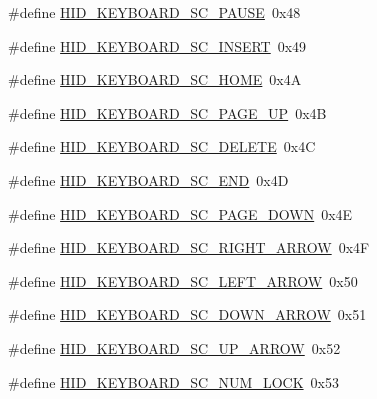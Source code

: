 \begin{DoxyCompactItemize}
\item 
\#define \hyperlink{group__Group__USBClassHIDCommon_gad817755f4cf1b28a8c1b7573e889bf60}{H\+I\+D\+\_\+\+K\+E\+Y\+B\+O\+A\+R\+D\+\_\+\+S\+C\+\_\+\+P\+A\+U\+SE}~0x48
\item 
\#define \hyperlink{group__Group__USBClassHIDCommon_gaf4e77aed5bf87814998181cf5f490067}{H\+I\+D\+\_\+\+K\+E\+Y\+B\+O\+A\+R\+D\+\_\+\+S\+C\+\_\+\+I\+N\+S\+E\+RT}~0x49
\item 
\#define \hyperlink{group__Group__USBClassHIDCommon_ga04421c912876322eeef26b76df417cc8}{H\+I\+D\+\_\+\+K\+E\+Y\+B\+O\+A\+R\+D\+\_\+\+S\+C\+\_\+\+H\+O\+ME}~0x4A
\item 
\#define \hyperlink{group__Group__USBClassHIDCommon_gae1cbb1ec35c17c9c86ae616e9da347c5}{H\+I\+D\+\_\+\+K\+E\+Y\+B\+O\+A\+R\+D\+\_\+\+S\+C\+\_\+\+P\+A\+G\+E\+\_\+\+UP}~0x4B
\item 
\#define \hyperlink{group__Group__USBClassHIDCommon_gacb7a4bec81a167c06d8fc97f8980849a}{H\+I\+D\+\_\+\+K\+E\+Y\+B\+O\+A\+R\+D\+\_\+\+S\+C\+\_\+\+D\+E\+L\+E\+TE}~0x4C
\item 
\#define \hyperlink{group__Group__USBClassHIDCommon_gabc373cfc74bcc5ba78ac54c8d4e27634}{H\+I\+D\+\_\+\+K\+E\+Y\+B\+O\+A\+R\+D\+\_\+\+S\+C\+\_\+\+E\+ND}~0x4D
\item 
\#define \hyperlink{group__Group__USBClassHIDCommon_ga939ecd9ad8d53dd9ed8be2b7734150a9}{H\+I\+D\+\_\+\+K\+E\+Y\+B\+O\+A\+R\+D\+\_\+\+S\+C\+\_\+\+P\+A\+G\+E\+\_\+\+D\+O\+WN}~0x4E
\item 
\#define \hyperlink{group__Group__USBClassHIDCommon_ga490e634f4b9e5efd5649c5675f4f62a0}{H\+I\+D\+\_\+\+K\+E\+Y\+B\+O\+A\+R\+D\+\_\+\+S\+C\+\_\+\+R\+I\+G\+H\+T\+\_\+\+A\+R\+R\+OW}~0x4F
\item 
\#define \hyperlink{group__Group__USBClassHIDCommon_ga688457b821511fdab0331d807407f97f}{H\+I\+D\+\_\+\+K\+E\+Y\+B\+O\+A\+R\+D\+\_\+\+S\+C\+\_\+\+L\+E\+F\+T\+\_\+\+A\+R\+R\+OW}~0x50
\item 
\#define \hyperlink{group__Group__USBClassHIDCommon_gaf0240bf1aacb3fdaedfeba4ba04b463a}{H\+I\+D\+\_\+\+K\+E\+Y\+B\+O\+A\+R\+D\+\_\+\+S\+C\+\_\+\+D\+O\+W\+N\+\_\+\+A\+R\+R\+OW}~0x51
\item 
\#define \hyperlink{group__Group__USBClassHIDCommon_gafe72c9ccff2916227e95c16bf7d3b163}{H\+I\+D\+\_\+\+K\+E\+Y\+B\+O\+A\+R\+D\+\_\+\+S\+C\+\_\+\+U\+P\+\_\+\+A\+R\+R\+OW}~0x52
\item 
\#define \hyperlink{group__Group__USBClassHIDCommon_ga4a8e1a7983fc998a6501c5868e8d6ada}{H\+I\+D\+\_\+\+K\+E\+Y\+B\+O\+A\+R\+D\+\_\+\+S\+C\+\_\+\+N\+U\+M\+\_\+\+L\+O\+CK}~0x53

\end{DoxyCompactItemize}
